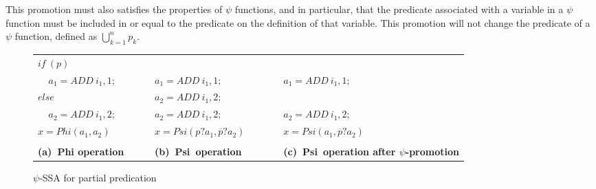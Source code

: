 \begin{itemize}
This promotion must also satisfies the properties of $\psi$
functions, and in particular, that the predicate associated with a
variable in a $\psi$ function must be included in or equal to the
predicate on the definition of that variable. This promotion will not
change the predicate of a $\psi$ function, defined as ${
  \bigcup_{k=1}^n p_k}$.

\begin{figure*}
\begin{center}
\footnotesize
\begin{tabular}{llllll}
${if\ (p)}$                   &          &                                          &          & \\
${\ \ \ \ \ a_1 = ADD\ i_1,1;}$ & \ \ \ \  & ${a_1 = ADD\ i_1,1;}$                & \ \ \ \  & ${a_1 = ADD\ i_1,1;}$ \\
${else}$                      & \ \ \ \  & ${a_2 = ADD\ i_1,2;}$                & \ \ \ \  & \\
${\ \ \ \ \ a_2 = ADD\ i_1,2;}$ & \ \ \ \  & ${a_2 = ADD\ i_1,2;}$                & \ \ \ \  & ${a_2 = ADD\ i_1,2;}$ \\
${x = Phi(a_1, a_2)}$          & \ \ \ \  & ${x = Psi(p?a_1, \overline{p}?a_2)}$ & \ \ \ \  & ${x = Psi(a_1, \overline{p}?a_2)}$ \\
\\
\multicolumn{2}{l}{\bf (a)\ Phi operation} & \multicolumn{2}{l}{\bf (b)\ Psi\ operation} & \multicolumn{2}{l}{\bf (c)\ Psi\ operation after $\psi$-promotion} \\
\end{tabular}
\caption{$\psi$-SSA for partial predication}
\label{fig:psi_partial}
\end{center}
\end{figure*}







\end{itemize}
